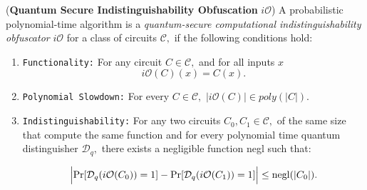 %
%


\begin{definition}\label{def:qiO} {\rm({\bf Quantum Secure Indistinguishability Obfuscation} $i\mathcal{O}$)}
A probabilistic polynomial-time algorithm is a \emph{quantum-secure computational indistinguishability obfuscator} $i\mathcal{O}$ for a class of circuits ${\mathcal C},$ if the following conditions hold:

\begin{enumerate}
\item {\tt Functionality:} For any circuit $C\in {\mathcal C},$ and for all inputs $x$ $$i\mathcal{O}(C)(x)=C(x).$$
\item  {\tt Polynomial Slowdown:}  For every $C\in \mathcal{C},$  $|i\mathcal{O}(C)| \in poly(|C|).$
\item {\tt Indistinguishability:} For any two circuits $C_0,C_1\in {\mathcal C},$ of the same size  that compute the same function
 and for every polynomial time quantum distinguisher $\mathcal{D}_q,$  there exists a negligible function {\rm negl} such that:

					$$\Big | {\rm Pr}[\mathcal{D}_q(i\mathcal{O}(C_0))=1]-{\rm Pr}[\mathcal{D}_q(i\mathcal{O}(C_1))=1] \Big |\leq  {\rm negl}(|C_0|).$$			
\end{enumerate}										
\end{definition}



